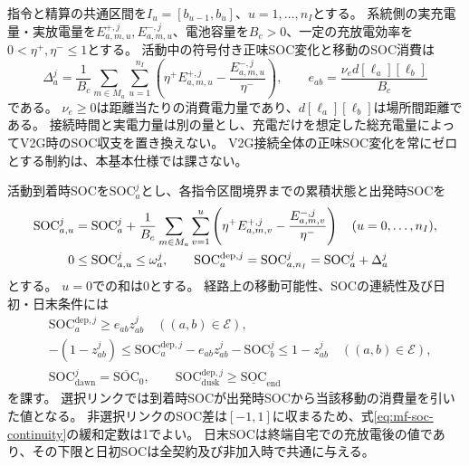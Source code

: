 指令と精算の共通区間を$I_u=[b_{u-1},b_u]$、$u=1,\ldots,n_I$とする。
系統側の実充電量・実放電量を$E_{a,m,u}^{+,j},E_{a,m,u}^{-,j}$、電池容量を$B_c>0$、一定の充放電効率を$0<\eta^+,\eta^-\le1$とする。
活動中の符号付き正味SOC変化と移動のSOC消費は
\begin{equation}
 \Delta_a^j=\frac{1}{B_c}\sum_{m\in M_a}\sum_{u=1}^{n_I}
 \left(\eta^+E_{a,m,u}^{+,j}-\frac{E_{a,m,u}^{-,j}}{\eta^-}\right),
 \qquad e_{ab}=\frac{\nu_e d[\ell_a][\ell_b]}{B_c}
 \label{eq:mf-net-soc}
\end{equation}
である。
$\nu_e\ge0$は距離当たりの消費電力量であり、$d[\ell_a][\ell_b]$は場所間距離である。
接続時間と実電力量は別の量とし、充電だけを想定した総充電量によってV2G時のSOC収支を置き換えない。
V2G接続全体の正味SOC変化を常にゼロとする制約は、本基本仕様では課さない。

活動到着時SOCを$\mathrm{SOC}_a^j$とし、各指令区間境界までの累積状態と出発時SOCを
\begin{align}
 \mathrm{SOC}_{a,u}^j
 &=\mathrm{SOC}_a^j+\frac{1}{B_c}
   \sum_{m\in M_a}\sum_{v=1}^{u}
   \left(\eta^+E_{a,m,v}^{+,j}-\frac{E_{a,m,v}^{-,j}}{\eta^-}\right)
   \quad(u=0,\ldots,n_I),\notag\\
 0&\le\mathrm{SOC}_{a,u}^j\le\omega_a^j,
 \qquad \mathrm{SOC}_a^{\mathrm{dep},j}
   =\mathrm{SOC}_{a,n_I}^j=\mathrm{SOC}_a^j+\Delta_a^j
 \label{eq:mf-soc-capacity}
\end{align}
とする。
$u=0$での和は0とする。
経路上の移動可能性、SOCの連続性及び日初・日末条件には
\begin{align}
 &\mathrm{SOC}_a^{\mathrm{dep},j}\ge e_{ab}z_{ab}^j
 \quad((a,b)\in\mathcal E),
 \label{eq:mf-soc-cover}\\
 &-(1-z_{ab}^j)\le
 \mathrm{SOC}_a^{\mathrm{dep},j}-e_{ab}z_{ab}^j-\mathrm{SOC}_b^j
 \le1-z_{ab}^j
 \quad((a,b)\in\mathcal E),
 \label{eq:mf-soc-continuity}\\
 &\mathrm{SOC}_{\mathrm{dawn}}^j=\overline{\mathrm{SOC}}_0,
 \qquad\mathrm{SOC}_{\mathrm{dusk}}^{\mathrm{dep},j}
 \ge\underline{\mathrm{SOC}}_{\mathrm{end}}
 \label{eq:mf-soc-anchors}
\end{align}
を課す。
選択リンクでは到着時SOCが出発時SOCから当該移動の消費量を引いた値となる。
非選択リンクのSOC差は$[-1,1]$に収まるため、式\eqref{eq:mf-soc-continuity}の緩和定数は1でよい。
日末SOCは終端自宅での充放電後の値であり、その下限と日初SOCは全契約及び非加入時で共通に与える。

